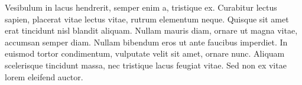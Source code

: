 \documentclass[12pt, letterpaper]{article}
\begin{document}
Vesibulum in lacus hendrerit, semper enim a, tristique ex. Curabitur lectus sapien, placerat vitae lectus vitae, rutrum elementum neque. Quisque sit amet erat tincidunt nisl blandit aliquam. Nullam mauris diam, ornare ut magna vitae, accumsan semper diam. Nullam bibendum eros ut ante faucibus imperdiet. In euismod tortor condimentum, vulputate velit sit amet, ornare nunc. Aliquam scelerisque tincidunt massa, nec tristique lacus feugiat vitae. Sed non ex vitae lorem eleifend auctor.
    
{\newpage}
\centering
    \vspace{5mm}
\end{document}
